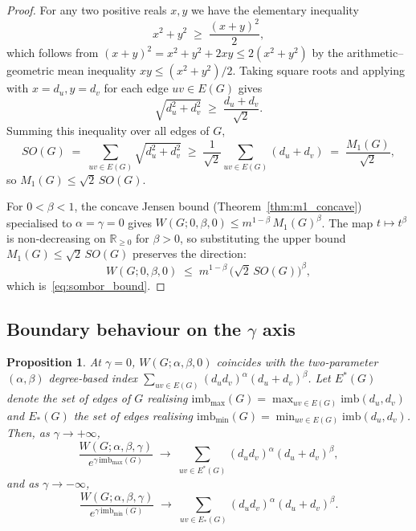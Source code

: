 \documentclass[a5paper, 10pt]{article}
\theoremstyle{plain}
\newtheorem{proposition}[theorem]{Proposition}
\theoremstyle{remark}
\theoremstyle{definition}
\newcommand{\Wuzi}{W(G;\alpha,\beta,\gamma)}
\begin{document}
\begin{proof}
For any two positive reals $x, y$ we have the elementary
inequality
\[
x^2 + y^2 \;\ge\; \frac{(x + y)^2}{2},
\]
which follows from $(x + y)^2 = x^2 + y^2 + 2xy \le 2(x^2 + y^2)$
by the arithmetic--geometric mean inequality
$xy \le (x^2 + y^2)/2$. Taking square roots and applying with
$x = d_u, y = d_v$ for each edge $uv \in E(G)$ gives
\[
\sqrt{d_u^2 + d_v^2}
\;\ge\;
\frac{d_u + d_v}{\sqrt{2}}.
\]
Summing this inequality over all edges of $G$,
\[
SO(G)
\;=\; \sum_{uv \in E(G)} \sqrt{d_u^2 + d_v^2}
\;\ge\;
\frac{1}{\sqrt{2}}\sum_{uv \in E(G)} (d_u + d_v)
\;=\;
\frac{M_1(G)}{\sqrt{2}},
\]
so $M_1(G) \le \sqrt{2}\, SO(G)$.

For $0 < \beta < 1$, the concave Jensen bound
(Theorem~\ref{thm:m1_concave}) specialised to $\alpha = \gamma = 0$
gives
$W(G; 0, \beta, 0) \le m^{1 - \beta}\, M_1(G)^{\beta}$. The map
$t \mapsto t^{\beta}$ is non-decreasing on $\mathbb{R}_{\ge 0}$
for $\beta > 0$, so substituting the upper bound
$M_1(G) \le \sqrt{2}\, SO(G)$ preserves the direction:
\[
W(G; 0, \beta, 0)
\;\le\;
m^{1 - \beta}\, \bigl(\sqrt{2}\, SO(G)\bigr)^{\beta},
\]
which is~\eqref{eq:sombor_bound}.
\end{proof}

\subsection{Boundary behaviour on the \texorpdfstring{$\gamma$}{gamma} axis}\label{sub:gamma_axis}

\begin{proposition}\label{prop:gamma_eq_0_or_inf}
At $\gamma = 0$, $W(G; \alpha, \beta, 0)$ coincides with the
two-parameter $(\alpha, \beta)$ degree-based index
$\sum_{uv \in E(G)} (d_u d_v)^{\alpha}(d_u + d_v)^{\beta}$.
Let $E^{*}(G)$ denote the set of edges of $G$ realising
$\mathrm{imb}_{\max}(G) = \max_{uv \in E(G)} \mathrm{imb}(d_u, d_v)$
and $E_{*}(G)$ the set of edges realising
$\mathrm{imb}_{\min}(G) = \min_{uv \in E(G)} \mathrm{imb}(d_u, d_v)$.
Then, as $\gamma \to +\infty$,
\[
\frac{\Wuzi}{e^{\gamma\, \mathrm{imb}_{\max}(G)}}
\;\longrightarrow\;
\sum_{uv \in E^{*}(G)} (d_u d_v)^{\alpha}(d_u + d_v)^{\beta},
\]
and as $\gamma \to -\infty$,
\[
\frac{\Wuzi}{e^{\gamma\, \mathrm{imb}_{\min}(G)}}
\;\longrightarrow\;
\sum_{uv \in E_{*}(G)} (d_u d_v)^{\alpha}(d_u + d_v)^{\beta}.
\]
\end{proposition}
\end{document}
